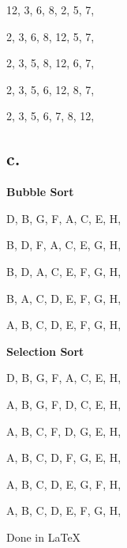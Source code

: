\documentclass{article}%
\begin{document}
12, 3, 6, 8, 2, 5, 7, 

2, 3, 6, 8, 12, 5, 7, 

2, 3, 5, 8, 12, 6, 7, 

2, 3, 5, 6, 12, 8, 7, 

2, 3, 5, 6, 7, 8, 12, 


\subsection*{c.}
\noindent \textbf{Bubble Sort}

D, B, G, F, A, C, E, H,

B, D, F, A, C, E, G, H,

B, D, A, C, E, F, G, H,
 
B, A, C, D, E, F, G, H,

A, B, C, D, E, F, G, H,

\noindent \textbf{Selection Sort}

D, B, G, F, A, C, E, H,

A, B, G, F, D, C, E, H,

A, B, C, F, D, G, E, H,

A, B, C, D, F, G, E, H,

A, B, C, D, E, G, F, H,

A, B, C, D, E, F, G, H,

\clearpage
\vspace*{0.5in}
\noindent Done in LaTeX
\end{document}
